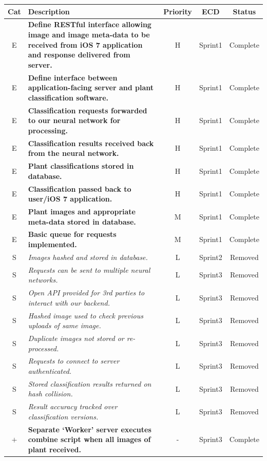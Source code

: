 \documentclass[a4paper,11pt]{article}
\begin{document}
\begin{table}[H]
\small
\centering
\begin{tabular}{ c p{11cm} c c c}
  Cat & Description & Priority & ECD & Status\\
  \hline 
  E & \textbf{Define RESTful interface allowing image and image meta-data to be received from iOS 7 application and response delivered from server.} & H & Sprint1 & Complete \\
  E & \textbf{Define interface between application-facing server and plant classification software.}  & H & Sprint1 & Complete \\
  E & \textbf{Classification requests forwarded to our neural network for processing.} & H & Sprint1 & Complete\\
  E & \textbf{Classification results received back from the neural network.} & H & Sprint1 & Complete \\
  E & \textbf{Plant classifications stored in database.} & H & Sprint1 & Complete \\
  E & \textbf{Classification passed back to user/iOS 7 application.} & H & Sprint1 & Complete \\
  E & \textbf{Plant images and appropriate meta-data stored in database.} & M & Sprint1 & Complete \\
  E & \textbf{Basic queue for requests implemented.} & M & Sprint1 & Complete \\
  S & \textit{Images hashed and stored in database.} & L & Sprint2 & Removed \\ 
  S & \textit{Requests can be sent to multiple neural networks.} & L & Sprint3 & Removed \\
  S & \textit{Open API provided for 3rd parties to interact with our backend.} & L & Sprint3 & Removed\\
  S & \textit{Hashed image used to check previous uploads of same image.} & L & Sprint3 & Removed \\
  S & \textit{Duplicate images not stored or re-processed.} & L & Sprint3 & Removed \\
  S & \textit{Requests to connect to server authenticated.} & L & Sprint3 & Removed \\
  S & \textit{Stored classification results returned on hash collision.} & L & Sprint3 & Removed \\
  S & \textit{Result accuracy tracked over classification versions.} & L & Sprint3 & Removed \\
  \hdashline
  $+$ & \textbf{Separate `Worker' server executes combine script when all images of plant received.} & - & Sprint3 & Complete \\
\end{tabular}
\end{table} 
\end{document}
